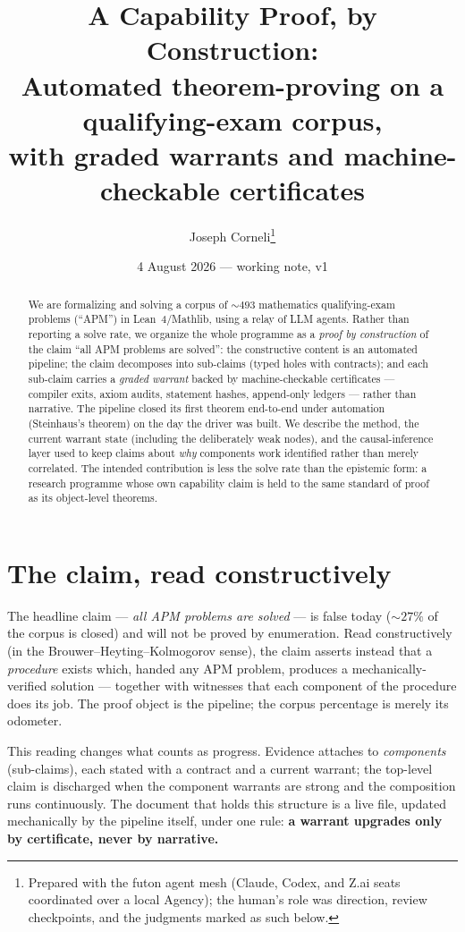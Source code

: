 \documentclass[11pt]{article}
\title{A Capability Proof, by Construction:\\
\large Automated theorem-proving on a qualifying-exam corpus,\\
with graded warrants and machine-checkable certificates}
\author{Joseph Corneli\thanks{Prepared with the futon agent mesh
(Claude, Codex, and Z.ai seats coordinated over a local Agency);
the human's role was direction, review checkpoints, and the
judgments marked as such below.}}
\date{4 August 2026 --- working note, v1}
\begin{document}
\maketitle

\begin{abstract}\noindent
We are formalizing and solving a corpus of ${\sim}493$ mathematics
qualifying-exam problems (``APM'') in Lean~4/Mathlib, using a relay of
LLM agents. Rather than reporting a solve rate, we organize the whole
programme as a \emph{proof by construction} of the claim ``all APM
problems are solved'': the constructive content is an automated
pipeline; the claim decomposes into sub-claims (typed holes with
contracts); and each sub-claim carries a \emph{graded warrant} backed
by machine-checkable certificates --- compiler exits, axiom audits,
statement hashes, append-only ledgers --- rather than narrative. The
pipeline closed its first theorem end-to-end under automation
(Steinhaus's theorem) on the day the driver was built. We describe the
method, the current warrant state (including the deliberately weak
nodes), and the causal-inference layer used to keep claims about
\emph{why} components work identified rather than merely correlated.
The intended contribution is less the solve rate than the epistemic
form: a research programme whose own capability claim is held to the
same standard of proof as its object-level theorems.
\end{abstract}

\section{The claim, read constructively}

The headline claim --- \emph{all APM problems are solved} --- is
false today (${\sim}27\%$ of the corpus is closed) and will not be
proved by enumeration. Read constructively (in the
Brouwer--Heyting--Kolmogorov sense), the claim asserts instead that a
\emph{procedure} exists which, handed any APM problem, produces a
mechanically-verified solution --- together with witnesses that each
component of the procedure does its job. The proof object is the
pipeline; the corpus percentage is merely its odometer.

This reading changes what counts as progress. Evidence attaches to
\emph{components} (sub-claims), each stated with a contract and a
current warrant; the top-level claim is discharged when the component
warrants are strong and the composition runs continuously. The
document that holds this structure is a live file, updated
mechanically by the pipeline itself, under one rule: \textbf{a warrant
upgrades only by certificate, never by narrative.}
\end{document}

